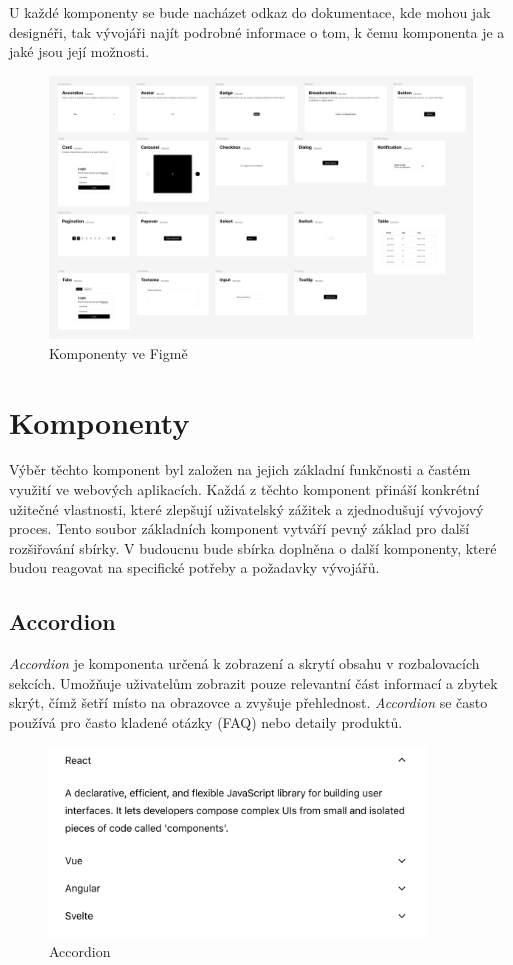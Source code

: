 U každé komponenty se bude nacházet odkaz do dokumentace, kde mohou jak designéři, tak vývojáři najít podrobné informace o tom, k čemu komponenta je a jaké jsou její možnosti.

\begin{figure}[H]
  \includegraphics[width=\textwidth]{images/figma-kit}
  \caption{Komponenty ve Figmě} \label{picture:figma-kit}
\end{figure}

\clearpage

\section{Komponenty}
Výběr těchto komponent byl založen na jejich základní funkčnosti a častém využití ve webových aplikacích. Každá z těchto komponent přináší konkrétní užitečné vlastnosti, které zlepšují uživatelský zážitek a zjednodušují vývojový proces. Tento soubor základních komponent vytváří pevný základ pro další rozšiřování sbírky. V budoucnu bude sbírka doplněna o další komponenty, které budou reagovat na specifické potřeby a požadavky vývojářů.

\subsection{Accordion}
\emph{Accordion} je komponenta určená k zobrazení a skrytí obsahu v rozbalovacích sekcích. Umožňuje uživatelům zobrazit pouze relevantní část informací a zbytek skrýt, čímž šetří místo na obrazovce a zvyšuje přehlednost. \emph{Accordion} se často používá pro často kladené otázky (FAQ) nebo detaily produktů.

\begin{figure}[H]
  \centering
  \includegraphics[width=10cm]{images/accordion}
  \captionsetup{justification=centering,margin=2cm}
  \caption{Accordion} \label{picture:accordion}
\end{figure}

